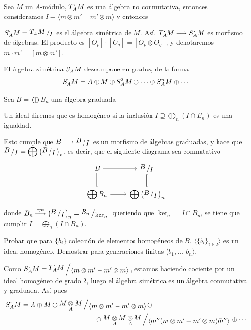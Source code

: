 Sea $M$ un $A$-m\'odulo, $T^{\boldsymbol{\cdot}}_AM$ es una \'algebra no conmutativa, entonces consideramos $I = \langle m \otimes m' - m' \otimes m\rangle$ y entonces
\begin{defi}
    $S^{\bdot}_AM = \modulo{T^{\bdot}_AM}{I}$ es el \'algebra sim\'etrica de $M$. As\'i, $T^{\boldsymbol{\cdot}}_AM \longrightarrow S^{\boldsymbol{\cdot}}_AM $ es morfismo de \'algebras. El producto es $[O_p]\cdot[O_q] = [O_p \otimes O_q]$, y denotaremos $m \cdot m' = [m \otimes m']$.
\end{defi}
\begin{propi}
    El \'algebra sim\'etrica $S^{\boldsymbol{\cdot}}_AM$ descompone en grados, de la forma 
    $$S^{\boldsymbol{\cdot}}_AM = A \oplus M \oplus S^{2}_AM \oplus \cdots \oplus S^{n}_AM \oplus \cdots$$
\end{propi}
Sea $\displaystyle B = \bigoplus B_n$ una \'algebra graduada
\begin{defi}
    Un ideal diremos que es homog\'eneo si la inclusi\'on $\displaystyle I \supseteq \bigoplus_n (I \cap B_n)$ es una igualdad.

    Esto cumple que $B \longrightarrow \modulo{B}{I}$ es un morfismo de \'algebras graduadas, y hace que $\displaystyle \modulo{B}{I} = \bigoplus \left(\modulo{B}{I}\right)_n$, es decir, que el siguiente diagrama sea conmutativo
    $$\bt B \arrow{r} \arrow[equal]{d} & \modulo{B}{I} \arrow[equal]{d} \\ \displaystyle \bigoplus B_n \arrow{r} & \displaystyle \bigoplus \left(\modulo{B}{I}\right)_n \et$$
    donde $B_n \overset{epi}{\longrightarrow}  \left(\modulo{B}{I}\right)_n = \modulo{B_n}{\ker_n\, }$ queriendo que $\ker_n = I \cap B_n$, se tiene que cumplir $\displaystyle I = \bigoplus_n (I \cap B_n)$.
\end{defi}
\begin{ejer}
    Probar que para $\{b_i\}$ colecci\'on de elementos homog\'eneos de $B$, $\langle\{b_i\}_{i \in I} \rangle$ es un ideal homog\'eneo. Demostrar para generaciones finitas $\langle b_1, \ldots, b_n \rangle$. 
\end{ejer}
Como $S^{\bdot}_AM = \modulo{T^{\bdot}_AM}{\langle m\otimes m' -m'\otimes m \rangle}$, estamos haciendo cociente por un ideal homog\'eneo de grado 2, luego el \'algebra sim\'etrica es un \'algebra conmutativa y graduada. As\'i pues
\begin{align*} S^{\bdot}_AM = A \oplus M \oplus \modulo{M \underset{A}{\otimes} M}{\langle m\otimes m' -m' \otimes m\rangle} \oplus & \\ 
&\hspace{-30mm} \oplus \modulo{M \underset{A}{\otimes} M \underset{A}{\otimes} M}{\langle m''(m\otimes m' -m' \otimes m)\bar m''\rangle} \oplus \cdots \end{align*}
